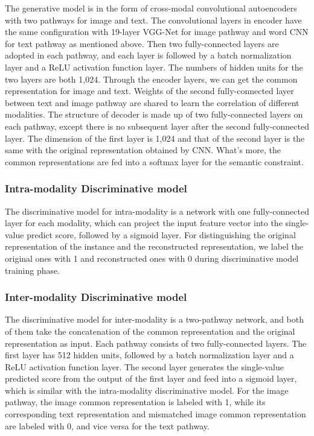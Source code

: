 \documentclass[journal]{IEEEtran}
\begin{document}
The generative model is in the form of cross-modal convolutional autoencoders with two pathways for image and text. The convolutional layers in encoder have the same configuration with 19-layer VGG-Net \cite{DBLP:journals/corr/SimonyanZ14a} for image pathway and word CNN \cite{DBLP:conf/emnlp/Kim14} for text pathway as mentioned above. Then two fully-connected layers are adopted in each pathway, and each layer is followed by a batch normalization layer and a ReLU activation function layer. The numbers of hidden units for the two layers are both 1,024. Through the encoder layers, we can get the common representation for image and text. 
Weights of the second fully-connected layer between text and image pathway are shared to learn the correlation of different modalities. The structure of decoder is made up of two fully-connected layers on each pathway, except there is no subsequent layer after the second fully-connected layer. The dimension of the first layer is 1,024 and that of the second layer is the same with the original representation obtained by CNN. What's more, the common representations are fed into a softmax layer for the semantic constraint. 

\subsubsection{Intra-modality Discriminative model}

The discriminative model for intra-modality is a network with one fully-connected layer for each modality, which can project the input feature vector into the single-value predict score, followed by a sigmoid layer. For distinguishing the original representation of the instance and the reconstructed representation, we label the original ones with 1 and reconstructed ones with 0 during discriminative model training phase.

\subsubsection{Inter-modality Discriminative model}

The discriminative model for inter-modality is a two-pathway network, and both of them take the concatenation of the common representation and the original representation as input. Each pathway consists of two fully-connected layers. The first layer has 512 hidden units, followed by a batch normalization layer and a ReLU activation function layer. The second layer generates the single-value predicted score from the output of the first layer and feed into a sigmoid layer, which is similar with the intra-modality discriminative model. For the image pathway, the image common representation is labeled with 1, while its corresponding text representation and mismatched image common representation are labeled with 0, and vice versa for the text pathway.
\end{document}
